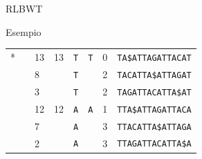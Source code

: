 \documentclass{beamer}
\begin{document}
\begin{frame}{RLBWT}
\begin{block}{Esempio\cite{rlpbwt}}
\begin{table}
\begin{tabular}{ P{0.5cm}|P{0.5cm}|P{0.4cm}|P{1.5cm}|P{0.65cm}|P{1.4cm}|P{0.6cm}|P{2.8cm}  }
          *     &           & 13    & 13            & {\tt T}   & {\tt T}   & 0 & {\tt TA\$ATTAGATTACAT} \\
                                          &           & 8     &               & {\tt T}   &           & 2 & {\tt TACATTA\$ATTAGAT} \\
                                          &           & 3     &               & {\tt T}   &           & 2 & {\tt TAGATTACATTA\$AT} \\
                                          &           & 12    & 12            & {\tt A}   & {\tt A}   & 1 & {\tt TTA\$ATTAGATTACA} \\
                                          &           & 7     &               & {\tt A}  &           & 3 & {\tt TTACATTA\$ATTAGA} \\
                                          &           & 2     &               & {\tt A}  &           & 3 & {\tt TTAGATTACATTA\$A} \\  
          \hline
        \end{tabular}
      \end{table}
    \end{block}
  
\end{frame}
\end{document}
